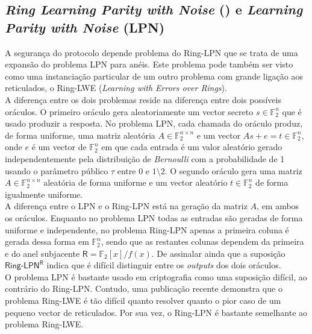 \subsection{\textit{Ring Learning Parity with Noise} (\RingLPN) e \textit{Learning Parity with Noise} (\textsf{LPN})}
A segurança do protocolo depende problema do \textsf{Ring-LPN} que se trata de uma expansão do problema \textsf{LPN} para anéis. Este problema pode também ser visto como uma instanciação particular de um outro problema com grande ligação aos reticulados, o \textsf{Ring-LWE} (\textit{Learning with Errors over Rings}).\\
A diferença entre os dois problemas reside na diferença entre dois possíveis oráculos. O primeiro oráculo gera aleatoriamente um vector secreto $s \in \mathbb{F}_2^n$ que é usado produzir a resposta. No problema \textsf{LPN}, cada chamada do oráculo produz, de forma uniforme, uma matriz aleatória $A \in \mathbb{F}_2^{n \times n}$ e um vector $As + e = t \in \mathbb{F}_2^n$, onde $e$ é um vector de $\mathbb{F}_2^n$ em que cada entrada é um valor aleatório gerado independentemente pela distribuição de \textit{Bernoulli} com a probabilidade de 1 usando o parâmetro público $\tau$ entre $0$ e $1 \setminus 2$. O segundo oráculo gera uma matriz $A \in \mathbb{F}_2^{n \times n}$ aleatória de forma uniforme e um vector aleatório $t \in \mathbb{F}_2^n$ de forma igualmente uniforme.\\
A diferença entre o \textsf{LPN} e o \textsf{Ring-LPN} está na geração da matriz $A$, em ambos os oráculos. Enquanto no problema \textsf{LPN} todas as entradas são geradas de forma uniforme e independente, no problema \textsf{Ring-LPN} apenas a primeira coluna é gerada dessa forma em $\mathbb{F}_2^n$, sendo que as restantes colunas dependem da primeira e do anel subjacente $\mathsf{R} = \mathbb{F}_2[x]/f(x)$. De assinalar ainda que a suposição $\textsf{Ring-LPN}^\mathsf{R}$ indica que é difícil distinguir entre os \textit{outputs} dos dois oráculos.\\
O problema \textsf{LPN} é bastante usado em criptografia como uma suposição difícil, ao contrário do \textsf{Ring-LPN}. Contudo, uma publicação recente demonstra que o problema \textsf{Ring-LWE} é tão difícil quanto resolver quanto o pior caso de um pequeno vector de reticulados. Por sua vez, o 
\textsf{Ring-LPN} é bastante semelhante ao problema \textsf{Ring-LWE}.
